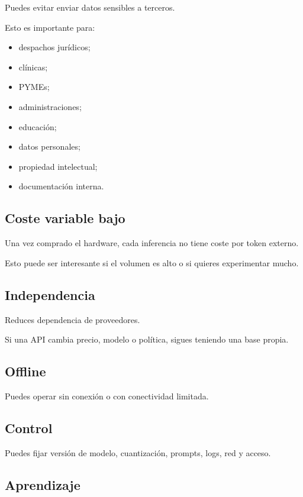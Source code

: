 Puedes evitar enviar datos sensibles a terceros.

Esto es importante para:

\begin{itemize}
\tightlist
\item
  despachos jurídicos;
\item
  clínicas;
\item
  PYMEs;
\item
  administraciones;
\item
  educación;
\item
  datos personales;
\item
  propiedad intelectual;
\item
  documentación interna.
\end{itemize}

\subsection{Coste variable bajo}\label{coste-variable-bajo}

Una vez comprado el hardware, cada inferencia no tiene coste por token
externo.

Esto puede ser interesante si el volumen es alto o si quieres
experimentar mucho.

\subsection{Independencia}\label{independencia}

Reduces dependencia de proveedores.

Si una API cambia precio, modelo o política, sigues teniendo una base
propia.

\subsection{Offline}\label{offline}

Puedes operar sin conexión o con conectividad limitada.

\subsection{Control}\label{control}

Puedes fijar versión de modelo, cuantización, prompts, logs, red y
acceso.

\subsection{Aprendizaje}\label{aprendizaje}

